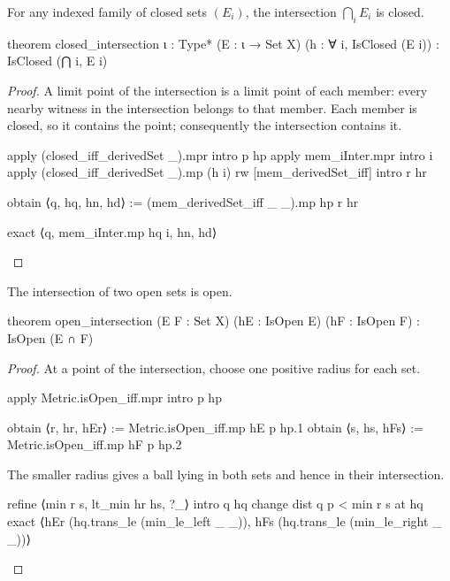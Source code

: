 \begin{corollary}
  \label{ma:cor:arbitrary-intersection-of-closed-sets-is-closed}
  For any indexed family of closed sets $(E_i)$, the intersection $\bigcap_i E_i$ is closed.

  \begin{lean}
    theorem closed_intersection {ι : Type*} (E : ι → Set X)
        (h : ∀ i, IsClosed (E i)) : IsClosed (⋂ i, E i)
  \end{lean}
\end{corollary}

\begin{proof}
  A limit point of the intersection is a limit point of each member: every nearby witness in the
  intersection belongs to that member.
  Each member is closed, so it contains the point; consequently the intersection contains it.

  \begin{lean}
    apply (closed_iff_derivedSet _).mpr
    intro p hp
    apply mem_iInter.mpr
    intro i
    apply (closed_iff_derivedSet _).mp (h i)
    rw [mem_derivedSet_iff]
    intro r hr

    obtain ⟨q, hq, hn, hd⟩ := (mem_derivedSet_iff _ _).mp hp r hr

    exact ⟨q, mem_iInter.mp hq i, hn, hd⟩
  \end{lean}

\end{proof}

\begin{lemma}
  \label{ma:lem:open-intersection}
  The intersection of two open sets is open.

  \begin{lean}
    theorem open_intersection (E F : Set X) (hE : IsOpen E) (hF : IsOpen F) :
        IsOpen (E ∩ F)
  \end{lean}
\end{lemma}

\begin{proof}
  At a point of the intersection, choose one positive radius for each set.

  \begin{lean}
    apply Metric.isOpen_iff.mpr
    intro p hp

    obtain ⟨r, hr, hEr⟩ := Metric.isOpen_iff.mp hE p hp.1
    obtain ⟨s, hs, hFs⟩ := Metric.isOpen_iff.mp hF p hp.2
  \end{lean}

  The smaller radius gives a ball lying in both sets and hence in their intersection.

  \begin{lean}
    refine ⟨min r s, lt_min hr hs, ?_⟩
    intro q hq
    change dist q p < min r s at hq
    exact ⟨hEr (hq.trans_le (min_le_left _ _)), hFs (hq.trans_le (min_le_right _ _))⟩
  \end{lean}
\end{proof}

